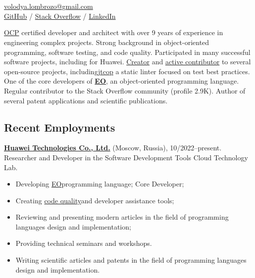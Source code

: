 \documentclass{vl}
\begin{document}
    \vlPrintPhoto{}

    \section*{\Large {}}

    \href{mailto:volodya.lombrozo@gmail.com}{volodya.lombrozo@gmail.com}\\%
    \href{https://github.com/volodya-lombrozo}{GitHub} /
    \href{https://stackoverflow.com/users/10423604/volodya-lombrozo}{Stack Overflow} /
    \href{https://www.linkedin.com/in/vladimir-zakharov-lombrozo-b71744216/}{LinkedIn}

    \vspace*{12pt}

    \href{https://catalog-education.oracle.com/pls/certview/sharebadge?id=87F6A2FE819A5A5AF4120A05900AB28A461EE9A3EE9FBFA02721FADAEB3BCE19}{OCP}
    certified developer and architect with over 9 years of experience in engineering complex projects.
    Strong background in object-oriented programming, software testing, and code quality.
    Participated in many successful software projects, including for Huawei.
    \href{https://github.com/volodya-lombrozo?tab=repositories}{Creator} and
    \href{https://github.com/volodya-lombrozo}{active contributor} to several open-source projects,
    including\href{https://github.com/volodya-lombrozo/jtcop}{jtcop} a static linter focused on test best practices.
    One of the core developers of \textbf{\href{https://www.eolang.org}{EO}}, an object-oriented programming language.
    Regular contributor to the Stack Overflow community (profile 2.9K).
    Author of several patent applications and scientific publications.

    \subsection*{Recent Employments}

    \textbf{\href{https://www.huawei.com}{Huawei Technologies Co., Ltd.}} (Moscow, Russia), 10/2022--present.\newline
    Researcher and Developer in the Software Development Tools Cloud Technology Lab.

    \begin{itemize}
        \item Developing \href{https://github.com/objectionary/eo}{EO}programming language; Core Developer;
        \item
        Creating \href{https://github.com/volodya-lombrozo/jtcop}{code quality}and developer assistance tools;
        \item Reviewing and presenting modern articles in the field of programming languages design and implementation;
        \item Providing technical seminars and workshops.
        \item Writing scientific articles and patents in the field of programming languages design and implementation.
    \end{itemize}
\end{document}
